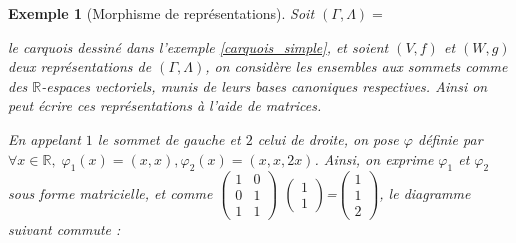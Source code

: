 \documentclass[a4paper,11pt]{article}
\newtheorem{ex}[thm]{Exemple}%
\begin{document}
\begin{ex}[Morphisme de représentations]
	Soit $(\Gamma,\Lambda)=$
		le carquois dessiné dans l'exemple \ref{carquois_simple}, et soient $(V,f)$ et $(W,g)$ deux représentations de $(\Gamma,\Lambda)$, on considère les ensembles aux sommets comme des $\mathbb R$-espaces vectoriels, munis de leurs bases canoniques respectives. Ainsi on peut écrire ces représentations à l'aide de matrices.
	\begin{center}
	\end{center}
En appelant $1$ le sommet de gauche et $2$ celui de droite, on pose $\varphi$ définie par $\forall x\in\mathbb R,\;\varphi_1(x)=(x,x),\varphi_2(x)=(x,x,2x)$. Ainsi, on exprime $\varphi_1$ et $\varphi_2$ sous forme matricielle, et comme $\begin{pmatrix}1&0\\0&1\\1&1\end{pmatrix}$ $\begin{pmatrix}1\\1\end{pmatrix}$=$\begin{pmatrix}1\\1\\2\end{pmatrix}$, le diagramme suivant commute :

\end{ex}
\end{document}

